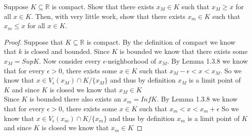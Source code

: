 \documentclass[12pt]{article}
\makeatletter
\theoremstyle{homework}
\newenvironment{exercise}[1]
{\def\@currentlabel{#1}\exercisecore}
{\endexercisecore}
\newcommand{\Reals}{\ensuremath{\mathbb R}}
\makeatother
\begin{document}
\begin{exercise}{Supplemental 2} 
 Suppose $K\subseteq \Reals$ is compact.  Show that
there exists $x_M\in K$ such that $x_M\ge x$ for all $x\in K$.  Then,
with very little work, show that there exists $x_m\in K$ such
that $x_m \le x$ for all $x\in K$.

\begin{proof}
  Suppose that $K\subseteq \Reals$ is compact. By the definition of compact we know that $k$ is closed and bounded.
  Since $K$ is bounded we know that there exists some $x_M = Sup K$. Now consider every $\epsilon$-neighborhood of $x_M$. By 
  Lemma 1.3.8 we know that for every $\epsilon>0$, there exists some $x \in K$ such that $x_M - \epsilon < x < x_M$. So we know that $x \in V_\epsilon(x_M)\cap K/\{x_M\}$ and thus by definition $x_M$ is a limit point of $K$
  and since $K$ is closed we know that $x_M \in K$\\

  Since $K$ is bounded there also exists an $x_m = Inf K$. By Lemma 1.3.8 we know that for every $\epsilon>0$, there exists some $x \in K$ such that $x_m < x < x_m + \epsilon$
  So we know that $x \in V_\epsilon(x_m)\cap K/\{x_m\}$ and thus by definition $x_m$ is a limit point of $K$ and since $K$ is closed we know that $x_m \in K$
\end{proof}
\end{exercise}
\vspace{.5in}
\end{document}
